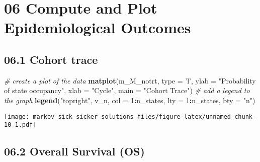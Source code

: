 \documentclass[
]{article}
\newenvironment{Shaded}{\begin{snugshade}}{\end{snugshade}}
\newcommand{\CommentTok}[1]{\textcolor[rgb]{0.56,0.35,0.01}{\textit{#1}}}
\newcommand{\DataTypeTok}[1]{\textcolor[rgb]{0.13,0.29,0.53}{#1}}
\newcommand{\DecValTok}[1]{\textcolor[rgb]{0.00,0.00,0.81}{#1}}
\newcommand{\KeywordTok}[1]{\textcolor[rgb]{0.13,0.29,0.53}{\textbf{#1}}}
\newcommand{\NormalTok}[1]{#1}
\newcommand{\OperatorTok}[1]{\textcolor[rgb]{0.81,0.36,0.00}{\textbf{#1}}}
\newcommand{\StringTok}[1]{\textcolor[rgb]{0.31,0.60,0.02}{#1}}
\begin{document}
\hypertarget{compute-and-plot-epidemiological-outcomes}{%
\section{06 Compute and Plot Epidemiological
Outcomes}\label{compute-and-plot-epidemiological-outcomes}}

\hypertarget{cohort-trace-1}{%
\subsection{06.1 Cohort trace}\label{cohort-trace-1}}

\begin{Shaded}
\begin{Highlighting}[]
\CommentTok{# create a plot of the data}
\KeywordTok{matplot}\NormalTok{(m_M_notrt, }\DataTypeTok{type =} \StringTok{'l'}\NormalTok{, }
        \DataTypeTok{ylab =} \StringTok{"Probability of state occupancy"}\NormalTok{,}
        \DataTypeTok{xlab =} \StringTok{"Cycle"}\NormalTok{,}
        \DataTypeTok{main =} \StringTok{"Cohort Trace"}\NormalTok{)             }
\CommentTok{# add a legend to the graph}
\KeywordTok{legend}\NormalTok{(}\StringTok{"topright"}\NormalTok{, v_n, }\DataTypeTok{col =} \DecValTok{1}\OperatorTok{:}\NormalTok{n_states, }\DataTypeTok{lty =} \DecValTok{1}\OperatorTok{:}\NormalTok{n_states, }\DataTypeTok{bty =} \StringTok{"n"}\NormalTok{) }
\end{Highlighting}
\end{Shaded}

\texttt{[image: markov\_sick-sicker\_solutions\_files/figure-latex/unnamed-chunk-10-1.pdf]}

\hypertarget{overall-survival-os}{%
\subsection{06.2 Overall Survival (OS)}\label{overall-survival-os}}
\end{document}
